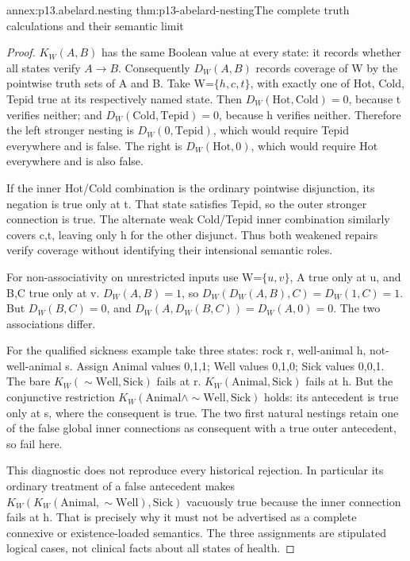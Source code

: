 \begin{annexitem}{annex:p13.abelard.nesting}
 {thm:p13-abelard-nesting}{The complete truth calculations and their semantic limit}
\begin{proof}
\(K_W(A,B)\) has the same Boolean value at every state:
it records whether all states verify \(A\to B\).
Consequently \(D_W(A,B)\) records coverage of W
by the pointwise truth sets of A and B.
Take W=\(\{h,c,t\}\), with exactly one of Hot,
Cold, Tepid true at its respectively named state.
Then \(D_W(\mathrm{Hot},\mathrm{Cold})=0\),
because t verifies neither; and
\(D_W(\mathrm{Cold},\mathrm{Tepid})=0\),
because h verifies neither.
Therefore the left stronger nesting is
\(D_W(0,\mathrm{Tepid})\), which would require
Tepid everywhere and is false.
The right is \(D_W(\mathrm{Hot},0)\), which would
require Hot everywhere and is also false.

If the inner Hot/Cold combination is the ordinary
pointwise disjunction, its negation is true only at t.
That state satisfies Tepid, so the outer stronger
connection is true. The alternate weak Cold/Tepid
inner combination similarly covers c,t, leaving
only h for the other disjunct. Thus both weakened
repairs verify coverage without identifying their
intensional semantic roles.

For non-associativity on unrestricted inputs use
W=\(\{u,v\}\), A true only at u, and B,C true
only at v. \(D_W(A,B)=1\), so
\(D_W(D_W(A,B),C)=D_W(1,C)=1\).
But \(D_W(B,C)=0\), and
\(D_W(A,D_W(B,C))=D_W(A,0)=0\).
The two associations differ.

For the qualified sickness example take three states:
rock r, well-animal h, not-well-animal s.
Assign Animal values 0,1,1; Well values 0,1,0;
Sick values 0,0,1.
The bare \(K_W(\sim\mathrm{Well},\mathrm{Sick})\)
fails at r. \(K_W(\mathrm{Animal},\mathrm{Sick})\)
fails at h. But the conjunctive restriction
\(K_W(\mathrm{Animal}\land\sim\mathrm{Well},\mathrm{Sick})\)
holds: its antecedent is true only at s, where
the consequent is true.
The two first natural nestings retain one of the
false global inner connections as consequent
with a true outer antecedent, so fail here.

This diagnostic does not reproduce every historical
rejection. In particular its ordinary treatment
of a false antecedent makes
\(K_W(K_W(\mathrm{Animal},\sim\mathrm{Well}),\mathrm{Sick})\)
vacuously true because the inner connection fails at h.
That is precisely why it must not be advertised
as a complete connexive or existence-loaded semantics.
The three assignments are stipulated logical cases,
not clinical facts about all states of health.
\end{proof}
\end{annexitem}

